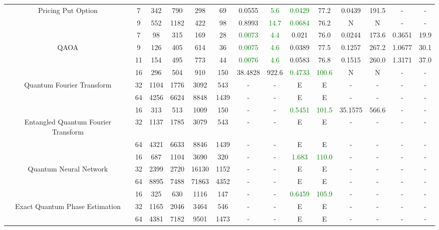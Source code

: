\begin{table}[htb]
{\begin{tabular}{|c|c|c|c|c|c|c|c|c|c|c|c|c|c|}
Pricing Put Option & 
7 & 342 & 790 & 298 & 69
 & 0.0555 & \textcolor{green}{5.6}
 & \textcolor{green}{0.0429} & 77.2
 & 0.0439 & 191.5
 & - & -
 \\
 & 
9 & 552 & 1182 & 422 & 98
 & 0.8993 & \textcolor{green}{14.7}
 & \textcolor{green}{0.0684} & 76.2
 & N & N 
 & - & -
 \\
\hline
 & 
7 & 98 & 315 & 169 & 28
 & \textcolor{green}{0.0073} & \textcolor{green}{4.4}
 & 0.021 & 76.0
 & 0.0244 & 173.6
 & 0.3651 & 19.9
 \\
QAOA & 
9 & 126 & 405 & 614 & 36
 & \textcolor{green}{0.0075} & \textcolor{green}{4.6}
 & 0.0389 & 77.5
 & 0.1257 & 267.2
 & 1.0677 & 30.1
 \\
 & 
11 & 154 & 495 & 773 & 44
 & \textcolor{green}{0.0076} & \textcolor{green}{4.6}
 & 0.0583 & 76.8
 & 0.1515 & 260.0
 & 1.3171 & 37.0
 \\
\hline
 & 
16 & 296 & 504 & 910 & 150
 & 38.4828 & 922.6
 & \textcolor{green}{0.4733} & \textcolor{green}{100.6}
 & N & N 
 & - & -
 \\
Quantum Fourier Transform & 
32 & 1104 & 1776 & 3092 & 543
 & - & -
 & E & E
 & - & -
 & - & -
 \\
 & 
64 & 4256 & 6624 & 8848 & 1439
 & - & -
 & E & E
 & - & -
 & - & -
 \\
\hline
 & 
16 & 313 & 513 & 1009 & 150
 & - & -
 & \textcolor{green}{0.5451} & \textcolor{green}{101.5}
 & 35.1575 & 566.6
 & - & -
 \\
Entangled Quantum Fourier Transform & 
32 & 1137 & 1785 & 3079 & 543
 & - & -
 & E & E
 & - & -
 & - & -
 \\
 & 
64 & 4321 & 6633 & 8846 & 1439
 & - & -
 & E & E
 & - & -
 & - & -
 \\
\hline
 & 
16 & 687 & 1104 & 3690 & 320
 & - & -
 & \textcolor{green}{1.683} & \textcolor{green}{110.0}
 & - & -
 & - & -
 \\
Quantum Neural Network & 
32 & 2399 & 2720 & 16130 & 1152
 & - & -
 & E & E
 & - & -
 & - & -
 \\
 & 
64 & 8895 & 7488 & 71863 & 4352
 & - & -
 & E & E
 & - & -
 & - & -
 \\
\hline
 & 
16 & 325 & 630 & 1116 & 147
 & - & -
 & \textcolor{green}{0.6459} & \textcolor{green}{105.9}
 & - & -
 & - & -
 \\
Exact Quantum Phase Estimation & 
32 & 1165 & 2046 & 3464 & 546
 & - & -
 & E & E
 & - & -
 & - & -
 \\
 & 
64 & 4381 & 7182 & 9501 & 1473
 & - & -
 & E & E
 & - & -
 & - & -
 \\

\end{tabular}}
\end{table}
